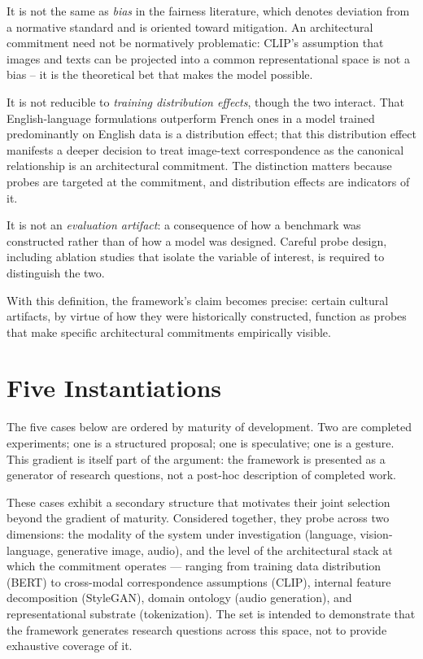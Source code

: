 \documentclass[
  twocolumn,
]{ceurart}
\begin{document}
It is not the same as \emph{bias} in the fairness literature, which denotes deviation from a normative standard and is oriented toward mitigation. An architectural commitment need not be normatively problematic: CLIP's assumption that images and texts can be projected into a common representational space is not a bias -- it is the theoretical bet that makes the model possible.

It is not reducible to \emph{training distribution effects}, though the two interact. That English-language formulations outperform French ones in a model trained predominantly on English data is a distribution effect; that this distribution effect manifests a deeper decision to treat image-text correspondence as the canonical relationship is an architectural commitment. The distinction matters because probes are targeted at the commitment, and distribution effects are indicators of it.

It is not an \emph{evaluation artifact}: a consequence of how a benchmark was constructed rather than of how a model was designed. Careful probe design, including ablation studies that isolate the variable of interest, is required to distinguish the two.

With this definition, the framework's claim becomes precise: certain cultural artifacts, by virtue of how they were historically constructed, function as probes that make specific architectural commitments empirically visible.

\section{Five Instantiations}

The five cases below are ordered by maturity of development. Two are completed experiments; one is a structured proposal; one is speculative; one is a gesture. This gradient is itself part of the argument: the framework is presented as a generator of research questions, not a post-hoc description of completed work.

These cases exhibit a secondary structure that motivates their joint selection beyond the gradient of maturity. Considered together, they probe across two dimensions: the modality of the system under investigation (language, vision-language, generative image, audio), and the level of the architectural stack at which the commitment operates — ranging from training data distribution (BERT) to cross-modal correspondence assumptions (CLIP), internal feature decomposition (StyleGAN), domain ontology (audio generation), and representational substrate (tokenization). The set is intended to demonstrate that the framework generates research questions across this space, not to provide exhaustive coverage of it.
\end{document}
